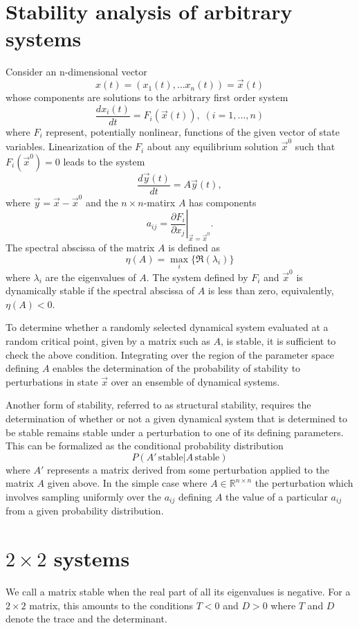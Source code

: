 \documentclass{amsart}
\theoremstyle{definition}
\theoremstyle{remark}
\numberwithin{equation}{section}
\begin{document}
\maketitle

\section{Stability analysis of arbitrary systems}

Consider an n-dimensional vector
$$
x(t) = (x_1(t), \ldots x_n(t)) = \vec{x}(t)
$$
whose components are solutions to the arbitrary first order system
$$
\frac{dx_i(t)}{dt} = F_i(\vec{x}(t)), \; (i=1,\ldots,n)
$$
where $F_i$ represent, potentially nonlinear, functions of the given vector of state variables. Linearization of the $F_i$ about any equilibrium solution $\vec{x}^0$ such that $F_i(\vec{x}^0)=0$ leads to the system
$$
\frac{d\vec{y}(t)}{dt} = A \vec{y}(t),
$$
where $\vec{y} = \vec{x} - \vec{x}^0$ and the $n \times n$-matirx $A$ has components
$$
a_{ij} = \left. \frac{\partial F_i}{\partial x_j} \right|_{\vec{x} = \vec{x}^0}.
$$
The spectral abscissa of the matrix $A$ is defined as
$$
\eta(A) = \max_i \{\Re(\lambda_i)\}
$$
where $\lambda_i$ are the eigenvalues of $A$. The system defined by $F_i$ and $\vec{x}^0$ is dynamically stable if the spectral abscissa of $A$ is less than zero, equivalently, $\eta(A) < 0$.

To determine whether a randomly selected dynamical system evaluated at a random critical point, given by a matrix such as $A$, is stable, it is sufficient to check the above condition. Integrating over the region of the parameter space defining $A$ enables the determination of the probability of stability to perturbations in state $\vec{x}$ over an ensemble of dynamical systems.

Another form of stability, referred to as structural stability, requires the determination of whether or not a given dynamical system that is determined to be stable remains stable under a perturbation to one of its defining parameters. This can be formalized as the conditional probability distribution
$$
P(A' \, \textrm{stable} | A \, \textrm{stable})
$$
where $A'$ represents a matrix derived from some perturbation applied to the matrix $A$ given above. In the simple case where $A \in \mathbb{R}^{n \times n}$ the perturbation which involves sampling uniformly over the $a_{ij}$ defining $A$ the value of a particular $a_{ij}$ from a given probability distribution.

\section{$2 \times 2$ systems}
We call a matrix stable when the real part of all its eigenvalues is negative.  For a $2 \times 2$ matrix, this amounts to the conditions $T < 0$ and $D >
0$ where $T$ and $D$ denote the trace and the determinant.
\end{document}
